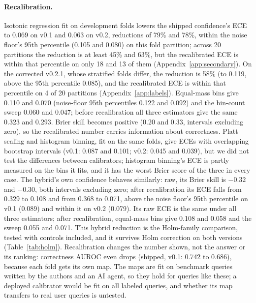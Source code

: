 \paragraph{Recalibration.} Isotonic regression fit on development folds lowers the shipped confidence's ECE to
0.069 on v0.1 and 0.063 on v0.2, reductions of 79\% and 78\%, within the noise floor's 95th percentile
(0.105 and 0.080) on this fold partition; across 20 partitions the reduction is at least 45\% and 63\%, but the
recalibrated ECE is within that percentile on only 18 and 13 of them (Appendix~\ref{app:secondary}). On the
corrected v0.2.1, whose stratified folds differ, the reduction is 58\% (to 0.119, above the 95th percentile
0.085), and the recalibrated ECE is within that percentile on 4 of 20 partitions (Appendix~\ref{app:labels}). Equal-mass bins give 0.110 and 0.070 (noise-floor 95th percentiles 0.122 and 0.092) and the
bin-count sweep 0.060 and 0.047; before recalibration all three estimators give the same 0.323 and 0.293. Brier skill becomes positive (0.20 and 0.33, intervals excluding zero), so the
recalibrated number carries information about correctness.
Platt scaling and histogram binning, fit on the same folds, give ECEs with overlapping bootstrap intervals (v0.1:
0.087 and 0.101; v0.2: 0.045 and 0.039), but we did not test the differences between calibrators; histogram binning's ECE is partly measured on the bins it fits, and
it has the worst Brier score of the three in every case. The hybrid's own confidence behaves similarly: raw, its
Brier skill is $-0.32$ and $-0.30$, both intervals excluding zero; after recalibration its ECE falls from 0.329 to
0.108 and from 0.368 to 0.071, above the noise floor's 95th percentile on v0.1 (0.089) and within it on v0.2
(0.079). Its raw ECE is the same under all three estimators; after recalibration, equal-mass bins give 0.108 and
0.058 and the sweep 0.055 and 0.071. This hybrid reduction is the Holm-family comparison, tested with controls included, and it survives Holm
correction on both versions (Table~\ref{tab:holm}). Recalibration changes the number shown, not the answer or its
ranking: correctness AUROC even drops (shipped, v0.1: 0.742 to 0.686), because each fold gets its own map.
The maps are fit on benchmark queries written by the authors and an AI agent, so they hold for queries like these;
a deployed calibrator would be fit on all labeled queries, and whether its map transfers to real user queries is
untested.

